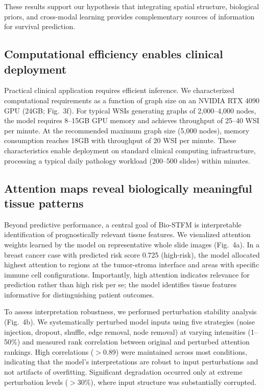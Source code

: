 \documentclass[pdflatex,sn-nature]{sn-jnl}%
\theoremstyle{thmstyleone}%
\theoremstyle{thmstyletwo}%
\theoremstyle{thmstylethree}%
\begin{document}
These results support our hypothesis that integrating spatial structure, biological priors, and cross-modal learning provides complementary sources of information for survival prediction.

\subsection{Computational efficiency enables clinical deployment}\label{subsec7}

Practical clinical application requires efficient inference. We characterized computational requirements as a function of graph size on an NVIDIA RTX 4090 GPU (24GB; Fig.~3f). For typical WSIs generating graphs of 2,000--4,000 nodes, the model requires 8--15GB GPU memory and achieves throughput of 25--40 WSI per minute. At the recommended maximum graph size (5,000 nodes), memory consumption reaches 18GB with throughput of 20 WSI per minute. These characteristics enable deployment on standard clinical computing infrastructure, processing a typical daily pathology workload (200--500 slides) within minutes.

\subsection{Attention maps reveal biologically meaningful tissue patterns}\label{subsec8}

Beyond predictive performance, a central goal of Bio-STFM is interpretable identification of prognostically relevant tissue features. We visualized attention weights learned by the model on representative whole slide images (Fig.~4a). In a breast cancer case with predicted risk score 0.725 (high-risk), the model allocated highest attention to regions at the tumor-stroma interface and areas with specific immune cell configurations. Importantly, high attention indicates relevance for prediction rather than high risk per se; the model identifies tissue features informative for distinguishing patient outcomes.

To assess interpretation robustness, we performed perturbation stability analysis (Fig.~4b). We systematically perturbed model inputs using five strategies (noise injection, dropout, shuffle, edge removal, node removal) at varying intensities (1--50\%) and measured rank correlation between original and perturbed attention rankings. High correlations ($>$0.89) were maintained across most conditions, indicating that the model's interpretations are robust to input perturbations and not artifacts of overfitting. Significant degradation occurred only at extreme perturbation levels ($>$30\%), where input structure was substantially corrupted.
\end{document}
